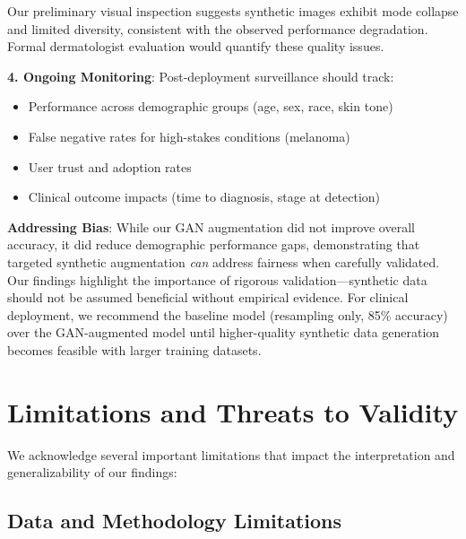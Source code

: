 \documentclass[10pt, twocolumn, letterpaper]{article}
\begin{document}
Our preliminary visual inspection suggests synthetic images exhibit mode collapse and limited diversity, consistent with the observed performance degradation. Formal dermatologist evaluation would quantify these quality issues.

\textbf{4. Ongoing Monitoring}: Post-deployment surveillance should track:
\begin{itemize}[leftmargin=*, itemsep=2pt]
    \item Performance across demographic groups (age, sex, race, skin tone)
    \item False negative rates for high-stakes conditions (melanoma)
    \item User trust and adoption rates
    \item Clinical outcome impacts (time to diagnosis, stage at detection)
\end{itemize}

\textbf{Addressing Bias}: While our GAN augmentation did not improve overall accuracy, it did reduce demographic performance gaps, demonstrating that targeted synthetic augmentation \textit{can} address fairness when carefully validated. Our findings highlight the importance of rigorous validation—synthetic data should not be assumed beneficial without empirical evidence. For clinical deployment, we recommend the baseline model (resampling only, 85\% accuracy) over the GAN-augmented model until higher-quality synthetic data generation becomes feasible with larger training datasets.

\section{Limitations and Threats to Validity}
\label{sec:limitations}

We acknowledge several important limitations that impact the interpretation and generalizability of our findings:

\subsection{Data and Methodology Limitations}
\end{document}
